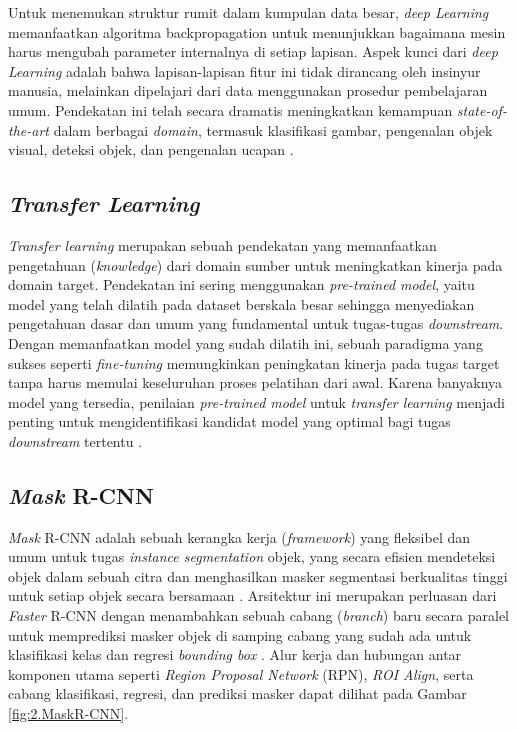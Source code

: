 Untuk menemukan struktur rumit dalam kumpulan data besar, \textit{deep Learning} memanfaatkan algoritma backpropagation untuk menunjukkan bagaimana mesin harus mengubah parameter internalnya di setiap lapisan. Aspek kunci dari \textit{deep Learning} adalah bahwa lapisan-lapisan fitur ini tidak dirancang oleh insinyur manusia, melainkan dipelajari dari data menggunakan prosedur pembelajaran umum. Pendekatan ini telah secara dramatis meningkatkan kemampuan \textit{state-of-the-art} dalam berbagai \textit{domain}, termasuk klasifikasi gambar, pengenalan objek visual, deteksi objek, dan pengenalan ucapan \cite{DeepLearning} \cite{DeepResidual}. \par

\subsection{\textit{Transfer Learning}} \label{II.TeoriTransferLearning}
\textit{Transfer learning} merupakan sebuah pendekatan yang memanfaatkan pengetahuan (\textit{knowledge}) dari domain sumber untuk meningkatkan kinerja pada domain target. Pendekatan ini sering menggunakan \textit{pre-trained model}, yaitu model yang telah dilatih pada dataset berskala besar sehingga menyediakan pengetahuan dasar dan umum yang fundamental untuk tugas-tugas \textit{downstream}. Dengan memanfaatkan model yang sudah dilatih ini, sebuah paradigma yang sukses seperti \textit{fine-tuning} memungkinkan peningkatan kinerja pada tugas target tanpa harus memulai keseluruhan proses pelatihan dari awal. Karena banyaknya model yang tersedia, penilaian \textit{pre-trained model} untuk \textit{transfer learning} menjadi penting untuk mengidentifikasi kandidat model yang optimal bagi tugas \textit{downstream} tertentu \cite{TransferLearning}. \par

\subsection{\textit{Mask} R-CNN} \label{II.TeoriMaskRCNN}
\textit{Mask} R-CNN adalah sebuah kerangka kerja (\textit{framework}) yang fleksibel dan umum untuk tugas \textit{instance segmentation} objek, yang secara efisien mendeteksi objek dalam sebuah citra dan menghasilkan masker segmentasi berkualitas tinggi untuk setiap objek secara bersamaan \cite{MaskRcnnIEEE11}. Arsitektur ini merupakan perluasan dari \textit{Faster} R-CNN dengan menambahkan sebuah cabang (\textit{branch}) baru secara paralel untuk memprediksi masker objek di samping cabang yang sudah ada untuk klasifikasi kelas dan regresi \textit{bounding box} \cite{MaskRcnnIEEE11}. Alur kerja dan hubungan antar komponen utama seperti \textit{Region Proposal Network} (RPN), \textit{ROI Align}, serta cabang klasifikasi, regresi, dan prediksi masker dapat dilihat pada Gambar \ref{fig:2.MaskR-CNN}.  \par

